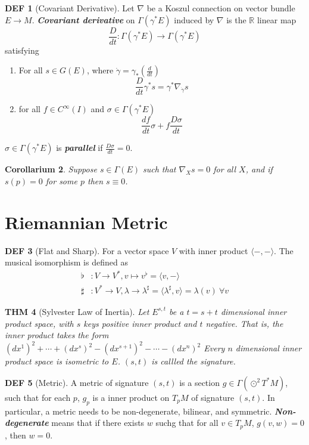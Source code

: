 \documentclass[twocolumn]{article}
\renewcommand{\emph}[1]{\textbf{\textit{#1}}}
\newcommand{\n}{\nabla}
\newcommand{\R}{\mathbb{R}}
\newcommand{\C}{C^{\infty}}
\newcommand{\G}{\Gamma}
\newcommand{\g}{\gamma}
\newtheorem{thm}{THM}
\newtheorem{corollary}[thm]{Corollarium}
\theoremstyle{definition}
\newtheorem{defi}[thm]{DEF}
\begin{document}
\begin{defi}[Covariant Derivative]
	Let $\n$ be a Koszul connection on vector bundle $E \rightarrow M$. 
	\emph{Covariant derivative} on $\G(\g^{*} E)$ induced by $\n$ is the $\R$ linear map 
	$$
	\frac{D}{dt} : \G(\g^* E) \rightarrow \G(\g^* E)
	$$
	satisfying 
	\begin{enumerate}
		\item For all $s \in G(E)$, where $\dot{\g} = \gamma_* (\frac{d}{dt})$
			$$
			\frac{D}{dt} \g^*s = \g^* \n_{\dot{\g}} s
			$$
		\item for all $f \in \C(I)$ and $\sigma \in \G(\g^*E)$
			$$
			\frac{df}{dt} \sigma + f \frac{D \sigma}{dt}
			$$
	\end{enumerate}

	$\sigma \in \G(\g^*E)$ is \emph{parallel} if $\frac{D \sigma}{dt} = 0$.
\end{defi}

\begin{corollary}
	Suppose $s \in \G(E)$ such that $\n_X s = 0$ for all $X$, and if $s(p) = 0$ for some $p$ then $s \equiv 0$.
\end{corollary}

\section{Riemannian Metric}

\begin{defi}[Flat and Sharp]
	 For a vector space $V$ with inner product $\langle -, - \rangle$. 
	 The musical isomorphism is defined as
	 \begin{align*}
		 \flat &: V \rightarrow V^*, v \mapsto v^{\flat} = \langle v, - \rangle \\
		 \sharp &:  V^* \rightarrow V, \lambda \rightarrow  \lambda^{\sharp} = \langle \lambda^{\sharp}, v \rangle = \lambda(v) \ \forall v
	 \end{align*}
\end{defi}

\begin{thm}[Sylvester Law of Inertia]
	Let $E^{s,t}$ be a $t = s+t$ dimensional inner product space, with $s$ keys positive inner product and $t$ negative. That is, the inner product takes the form $(dx^1)^2 + \cdots + (dx^s)^2 - (dx^{s+1})^2 - \cdots - (dx^n)^2$
	Every $n$ dimensional inner product space is isometric to $E$.
	$(s, t)$ is callled the signature.
\end{thm}

\begin{defi}[Metric]
	A metric of signature $(s,t)$ is a section $g \in \G(\odot ^2 T^*M)$, such that for each $p$, $g_p$ is a inner product on $T_pM$ of signature $(s, t)$.
	In particular, a metric needs to be non-degenerate, bilinear, and symmetric.
	\emph{Non-degenerate} means that if there exists $w$ suchg that for all $v \in T_pM$, $g(v, w) = 0$, then $w = 0$.
\end{defi}
\end{document}
